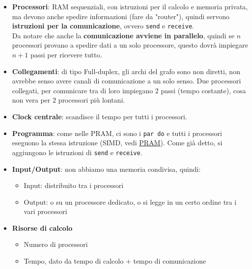 \begin{itemize}
	\item \textbf{Processori}: RAM sequenziali, con istruzioni per il calcolo e memoria privata, ma devono anche spedire informazioni (fare da "router"), quindi servono \textbf{istruzioni per la comunicazione}, ovvero \texttt{send} e \texttt{receive}.\\
	Da notare che anche la \textbf{comunicazione avviene in parallelo}, quindi se $n$ processori provano a spedire dati a un solo processore, questo dovrà impiegare $n+1$ passi per ricevere tutto.\\
	
	\item \textbf{Collegamenti}: di tipo Full-duplex, gli archi del grafo sono non diretti, non avrebbe senso avere canali di comunicazione a un solo senso. Due processori collegati, per comunicare tra di loro impiegano 2 passi (tempo costante), cosa non vera per 2 processori più lontani.\\
	
	\item \textbf{Clock centrale}: scandisce il tempo per tutti i processori.\\
	
	\item \textbf{Programma}: come nelle PRAM, ci sono i \texttt{par do} e tutti i processori eseguono la stessa istruzione (SIMD, vedi \hyperref[subsubsec:PRAM]{PRAM}). Come già detto, si aggiungono le istruzioni di \texttt{send} e \texttt{receive}.\\
	
	\item \textbf{Input/Output}: non abbiamo una memoria condivisa, quindi: 
	\begin{itemize}
		\item Input: distribuito tra i processori
		\item Output: o su un processore dedicato, o si legge in un certo ordine tra i vari processori
	\end{itemize}
	\nn
	
	\item \textbf{Risorse di calcolo}
	\begin{itemize}
		\item Numero di processori
		\item Tempo, dato da tempo di calcolo $+$ tempo di comunicazione
	\end{itemize}
\end{itemize}

\newpage

